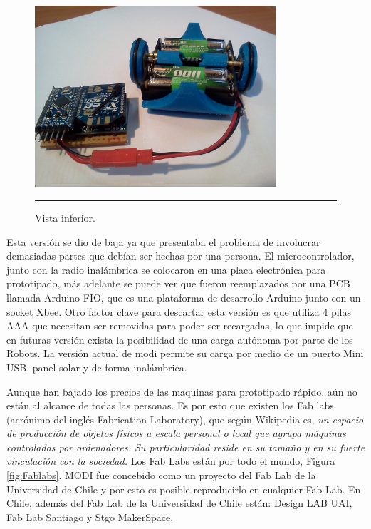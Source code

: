 \begin{figure}[htbp]
	\centering
		\includegraphics[width=0.8\textwidth]{./Pictures/3MODIrev2.jpg}
		\rule{35em}{0.5pt}
	\caption[modirev1]{Vista inferior.}
	\label{fig:3modirev2}
\end{figure}

Esta versión se dio de baja ya que presentaba el problema de involucrar demasiadas partes que debían ser hechas por una persona. El microcontrolador, junto con la radio inalámbrica se colocaron en una placa electrónica para prototipado, más adelante se puede ver que fueron reemplazados por una PCB llamada Arduino FIO, que es una plataforma de desarrollo Arduino junto con un socket Xbee. Otro factor clave para descartar esta versión es que utiliza 4 pilas AAA que necesitan ser removidas para poder ser recargadas, lo que impide que en futuras versión exista la posibilidad de una carga autónoma por parte de los Robots. La versión actual de modi permite su carga por medio de un puerto Mini USB, panel solar y de forma inalámbrica.

Aunque han bajado los precios de las maquinas para prototipado rápido, aún no están al alcance de todas las personas. Es por esto que existen los Fab labs (acrónimo del inglés Fabrication Laboratory), que según Wikipedia es, \textit{un espacio de producción de objetos físicos a escala personal o local que agrupa máquinas controladas por ordenadores. Su particularidad reside en su tamaño y en su fuerte vinculación con la sociedad.} Los Fab Labs están por todo el mundo, Figura \ref{fig:Fablabs}. MODI fue concebido como un proyecto del Fab Lab de la Universidad de Chile y por esto es posible reproducirlo en cualquier Fab Lab. En Chile, además del Fab Lab de la Universidad de Chile están: Design LAB UAI, Fab Lab Santiago y Stgo MakerSpace. 

